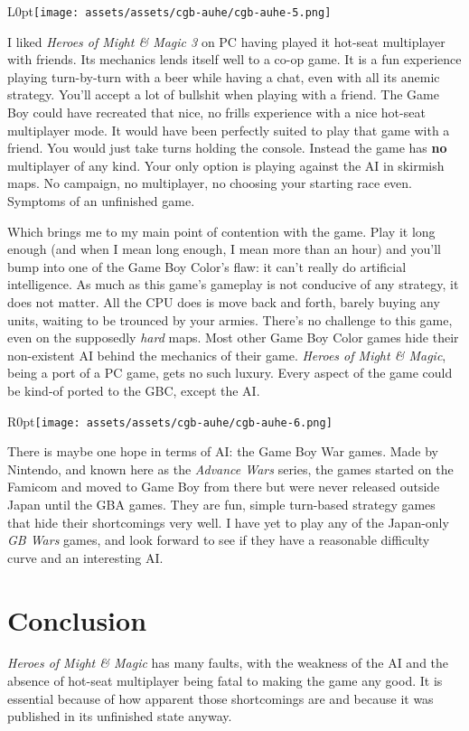 \documentclass{book}
\begin{document}
\begin{wrapfigure}{L}{0pt}{\texttt{[image: assets/assets/cgb-auhe/cgb-auhe-5.png]}}\end{wrapfigure}\noindent
I liked \emph{Heroes of Might \& Magic 3} on PC having played it hot-seat multiplayer with friends. Its mechanics lends itself well to a co-op game. It is a fun experience playing turn-by-turn with a beer while having a chat, even with all its anemic strategy. You’ll accept a lot of bullshit when playing with a friend. The Game Boy could have recreated that nice, no frills experience with a nice hot-seat multiplayer mode. It would have been perfectly suited to play that game with a friend. You would just take turns holding the console. Instead the game has \textbf{no} multiplayer of any kind. Your only option is playing against the AI in skirmish maps. No campaign, no multiplayer, no choosing your starting race even. Symptoms of an unfinished game.\par
Which brings me to my main point of contention with the game. Play it long enough (and when I mean long enough, I mean more than an hour) and you’ll bump into one of the Game Boy Color’s flaw: it can’t really do artificial intelligence. As much as this game’s gameplay is not conducive of any strategy, it does not matter. All the CPU does is move back and forth, barely buying any units, waiting to be trounced by your armies. There’s no challenge to this game, even on the supposedly \emph{hard} maps. Most other Game Boy Color games hide their non-existent AI behind the mechanics of their game. \emph{Heroes of Might \& Magic}, being a port of a PC game, gets no such luxury. Every aspect of the game could be kind-of ported to the GBC, except the AI.\par
\begin{wrapfigure}{R}{0pt}{\texttt{[image: assets/assets/cgb-auhe/cgb-auhe-6.png]}}\end{wrapfigure}
There is maybe one hope in terms of AI: the Game Boy War games. Made by Nintendo, and known here as the \emph{Advance Wars} series, the games started on the Famicom and moved to Game Boy from there but were never released outside Japan until the GBA games. They are fun, simple turn-based strategy games that hide their shortcomings very well. I have yet to play any of the Japan-only \emph{GB Wars} games, and look forward to see if they have a reasonable difficulty curve and an interesting AI.\par
\FloatBarrier\section*{Conclusion}
\emph{Heroes of Might \& Magic} has many faults, with the weakness of the AI and the absence of hot-seat multiplayer being fatal to making the game any good. It is essential because of how apparent those shortcomings are and because it was published in its unfinished state anyway.\par
\end{document}
